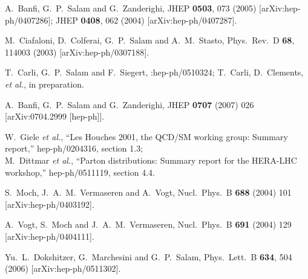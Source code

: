 \documentclass[12pt]{article}
\begin{document}
\begin{thebibliography}{99}
  A.~Banfi, G.~P.~Salam and G.~Zanderighi,
  JHEP {\bf 0503}, 073 (2005)
  [arXiv:hep-ph/0407286];
%
  JHEP {\bf 0408}, 062 (2004)
  [arXiv:hep-ph/0407287].

  M.~Ciafaloni, D.~Colferai, G.~P.~Salam and A.~M.~Stasto,
  Phys.\ Rev.\  D {\bf 68}, 114003 (2003)
  [arXiv:hep-ph/0307188].


  T.~Carli, G.~P.~Salam and F.~Siegert,
  :hep-ph/0510324;
  T.~Carli, D.~Clements, {\it et al.}, in preparation.

  A.~Banfi, G.~P.~Salam and G.~Zanderighi,
  JHEP {\bf 0707} (2007) 026
  [arXiv:0704.2999 [hep-ph]].


  W.~Giele {\it et al.},
  ``Les Houches 2001, the QCD/SM working group: Summary report,''
  hep-ph/0204316, section 1.3;\\
  M.~Dittmar {\it et al.},
  ``Parton distributions: Summary report for the HERA-LHC workshop,''
  hep-ph/0511119, section 4.4.


  S.~Moch, J.~A.~M.~Vermaseren and A.~Vogt,
  Nucl.\ Phys.\ B {\bf 688} (2004) 101
  [arXiv:hep-ph/0403192].

  A.~Vogt, S.~Moch and J.~A.~M.~Vermaseren,
  Nucl.\ Phys.\ B {\bf 691} (2004) 129
  [arXiv:hep-ph/0404111].

  Yu.~L.~Dokshitzer, G.~Marchesini and G.~P.~Salam,
  Phys.\ Lett.\  B {\bf 634}, 504 (2006)
  [arXiv:hep-ph/0511302].


\end{thebibliography}
\end{document}
